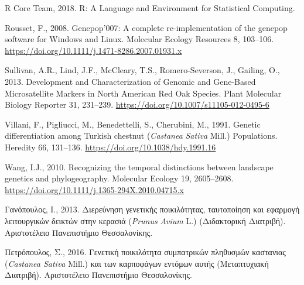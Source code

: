 \documentclass[12pt,a4paper,]{report}
\begin{document}
\leavevmode\hypertarget{ref-RCoreTeam2018}{}%
R Core Team, 2018. R: A Language and Environment for Statistical
Computing.

\leavevmode\hypertarget{ref-Rousset2008}{}%
Rousset, F., 2008. Genepop'007: A complete re-implementation of the
genepop software for Windows and Linux. Molecular Ecology Resources 8,
103--106. \url{https://doi.org/10.1111/j.1471-8286.2007.01931.x}

\leavevmode\hypertarget{ref-Sullivan2013}{}%
Sullivan, A.R., Lind, J.F., McCleary, T.S., Romero-Severson, J.,
Gailing, O., 2013. Development and Characterization of Genomic and
Gene-Based Microsatellite Markers in North American Red Oak Species.
Plant Molecular Biology Reporter 31, 231--239.
\url{https://doi.org/10.1007/s11105-012-0495-6}

\leavevmode\hypertarget{ref-Villani1991}{}%
Villani, F., Pigliucci, M., Benedettelli, S., Cherubini, M., 1991.
Genetic differentiation among Turkish chestnut (\emph{Castanea}
\emph{Sativa} Mill.) Populations. Heredity 66, 131--136.
\url{https://doi.org/10.1038/hdy.1991.16}

\leavevmode\hypertarget{ref-Wang2010a}{}%
Wang, I.J., 2010. Recognizing the temporal distinctions between
landscape genetics and phylogeography. Molecular Ecology 19, 2605--2608.
\url{https://doi.org/10.1111/j.1365-294X.2010.04715.x}

\leavevmode\hypertarget{ref-__2013}{}%
Γανόπουλος, Ι., 2013. Διερεύνηση γενετικής ποικιλότητας, ταυτοποίηση και
εφαρμογή λειτουργικών δεικτών στην κερασιά (\emph{Prunus} \emph{Avium}
L.) (Διδακτορική Διατριβή). Αριστοτέλειο Πανεπιστήμιο Θεσσαλονίκης.

\leavevmode\hypertarget{ref-2016a}{}%
Πετρόπουλος, Σ., 2016. Γενετική ποικιλότητα συμπατρικών πληθυσμών
καστανιας (\emph{Castanea Sativa} Mill.) και των καρποφάγων εντόμων
αυτής (Mεταπτυχιακή Διατριβή). Αριστοτέλειο Πανεπιστήμιο Θεσσαλονίκης.
\end{document}
